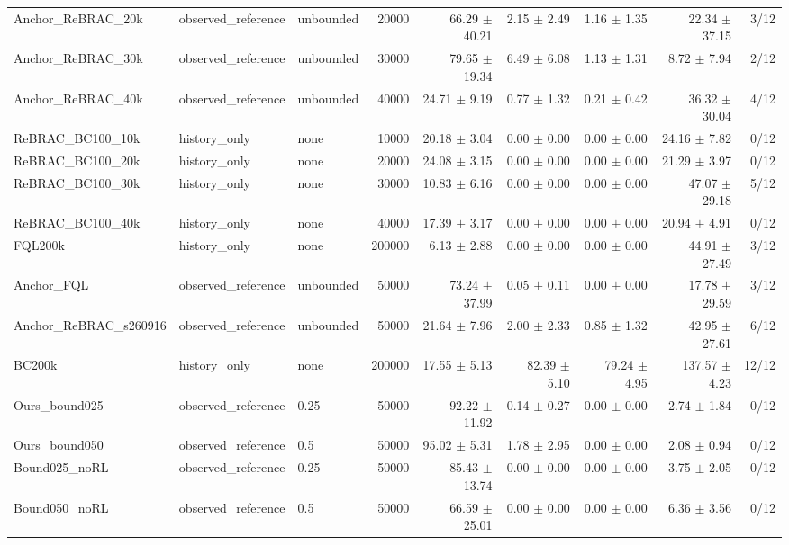 \begin{tabular}{lllrrrrrr}
Anchor\_ReBRAC\_20k & observed\_reference & unbounded & 20000 & 66.29 $\pm$ 40.21 & 2.15 $\pm$ 2.49 & 1.16 $\pm$ 1.35 & 22.34 $\pm$ 37.15 & 3/12 \\
Anchor\_ReBRAC\_30k & observed\_reference & unbounded & 30000 & 79.65 $\pm$ 19.34 & 6.49 $\pm$ 6.08 & 1.13 $\pm$ 1.31 & 8.72 $\pm$ 7.94 & 2/12 \\
Anchor\_ReBRAC\_40k & observed\_reference & unbounded & 40000 & 24.71 $\pm$ 9.19 & 0.77 $\pm$ 1.32 & 0.21 $\pm$ 0.42 & 36.32 $\pm$ 30.04 & 4/12 \\
ReBRAC\_BC100\_10k & history\_only & none & 10000 & 20.18 $\pm$ 3.04 & 0.00 $\pm$ 0.00 & 0.00 $\pm$ 0.00 & 24.16 $\pm$ 7.82 & 0/12 \\
ReBRAC\_BC100\_20k & history\_only & none & 20000 & 24.08 $\pm$ 3.15 & 0.00 $\pm$ 0.00 & 0.00 $\pm$ 0.00 & 21.29 $\pm$ 3.97 & 0/12 \\
ReBRAC\_BC100\_30k & history\_only & none & 30000 & 10.83 $\pm$ 6.16 & 0.00 $\pm$ 0.00 & 0.00 $\pm$ 0.00 & 47.07 $\pm$ 29.18 & 5/12 \\
ReBRAC\_BC100\_40k & history\_only & none & 40000 & 17.39 $\pm$ 3.17 & 0.00 $\pm$ 0.00 & 0.00 $\pm$ 0.00 & 20.94 $\pm$ 4.91 & 0/12 \\
FQL200k & history\_only & none & 200000 & 6.13 $\pm$ 2.88 & 0.00 $\pm$ 0.00 & 0.00 $\pm$ 0.00 & 44.91 $\pm$ 27.49 & 3/12 \\
Anchor\_FQL & observed\_reference & unbounded & 50000 & 73.24 $\pm$ 37.99 & 0.05 $\pm$ 0.11 & 0.00 $\pm$ 0.00 & 17.78 $\pm$ 29.59 & 3/12 \\
Anchor\_ReBRAC\_s260916 & observed\_reference & unbounded & 50000 & 21.64 $\pm$ 7.96 & 2.00 $\pm$ 2.33 & 0.85 $\pm$ 1.32 & 42.95 $\pm$ 27.61 & 6/12 \\
BC200k & history\_only & none & 200000 & 17.55 $\pm$ 5.13 & 82.39 $\pm$ 5.10 & 79.24 $\pm$ 4.95 & 137.57 $\pm$ 4.23 & 12/12 \\
Ours\_bound025 & observed\_reference & 0.25 & 50000 & 92.22 $\pm$ 11.92 & 0.14 $\pm$ 0.27 & 0.00 $\pm$ 0.00 & 2.74 $\pm$ 1.84 & 0/12 \\
Ours\_bound050 & observed\_reference & 0.5 & 50000 & 95.02 $\pm$ 5.31 & 1.78 $\pm$ 2.95 & 0.00 $\pm$ 0.00 & 2.08 $\pm$ 0.94 & 0/12 \\
Bound025\_noRL & observed\_reference & 0.25 & 50000 & 85.43 $\pm$ 13.74 & 0.00 $\pm$ 0.00 & 0.00 $\pm$ 0.00 & 3.75 $\pm$ 2.05 & 0/12 \\
Bound050\_noRL & observed\_reference & 0.5 & 50000 & 66.59 $\pm$ 25.01 & 0.00 $\pm$ 0.00 & 0.00 $\pm$ 0.00 & 6.36 $\pm$ 3.56 & 0/12 \\

\end{tabular}

